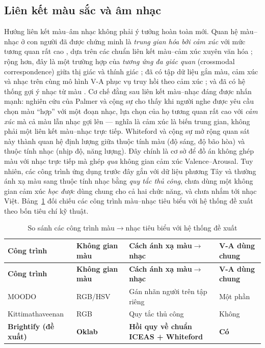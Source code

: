 \documentclass[../DoAn.tex]{subfiles}
\begin{document}
\subsection{Liên kết màu sắc và âm nhạc}
\label{subsection:2.1.3}
Hướng liên kết màu--âm nhạc không phải ý tưởng hoàn toàn mới. Quan hệ màu--nhạc ở con người đã được chứng minh là \textit{trung gian hóa bởi cảm xúc} với mức tương quan rất cao \cite{palmer2013music, whiteford2018color}, dựa trên các chuẩn liên kết màu--cảm xúc xuyên văn hóa \cite{jonauskaite2020universal}; rộng hơn, đây là một trường hợp của \textit{tương ứng đa giác quan} (crossmodal correspondence) giữa thị giác và thính giác \cite{spence2011crossmodal}; đã có tập dữ liệu gắn màu, cảm xúc và nhạc trên cùng mô hình V-A phục vụ truy hồi theo cảm xúc \cite{pesek2017moodo}; và đã có hệ thống gợi ý nhạc từ màu \cite{kittimathaveenan2020color}. Cơ chế đằng sau liên kết màu--nhạc đáng được nhấn mạnh: nghiên cứu của Palmer và cộng sự \cite{palmer2013music} cho thấy khi người nghe được yêu cầu chọn màu ``hợp'' với một đoạn nhạc, lựa chọn của họ tương quan rất cao với \textit{cảm xúc} mà cả màu lẫn nhạc gợi lên --- nghĩa là cảm xúc là biến trung gian, không phải một liên kết màu--nhạc trực tiếp. Whiteford và cộng sự \cite{whiteford2018color} mở rộng quan sát này thành quan hệ định lượng giữa thuộc tính màu (độ sáng, độ bão hòa) và thuộc tính nhạc (nhịp độ, năng lượng). Đây chính là cơ sở để đồ án không ghép màu với nhạc trực tiếp mà ghép \textit{qua} không gian cảm xúc Valence--Arousal. Tuy nhiên, các công trình ứng dụng trước đây gắn với dữ liệu phương Tây và thường ánh xạ màu sang thuộc tính nhạc bằng \textit{quy tắc thủ công}, chưa dùng một không gian cảm xúc \textit{học được} dùng chung cho cả hai chức năng, và chưa nhắm tới nhạc Việt. Bảng~\ref{table:colorprior} đối chiếu các công trình màu--nhạc tiêu biểu với hệ thống đề xuất theo bốn tiêu chí kỹ thuật.

\begin{longtable}{|p{3.0cm}|p{2.4cm}|p{3.0cm}|p{2.6cm}|}
\caption{So sánh các công trình màu$\rightarrow$nhạc tiêu biểu với hệ thống đề xuất}\label{table:colorprior}\\
\hline
\textbf{Công trình} & \textbf{Không gian màu} & \textbf{Cách ánh xạ màu$\rightarrow$nhạc} & \textbf{V-A dùng chung} \\
\hline
\endfirsthead
\hline
\textbf{Công trình} & \textbf{Không gian màu} & \textbf{Cách ánh xạ màu$\rightarrow$nhạc} & \textbf{V-A dùng chung} \\
\hline
\endhead
MOODO \cite{pesek2017moodo} & RGB/HSV & Gán nhãn người trên tập riêng & Một phần \\
\hline
Kittimathaveenan \cite{kittimathaveenan2020color} & RGB & Quy tắc thủ công & Không \\
\hline
\textbf{Brightify (đề xuất)} & \textbf{Oklab} & \textbf{Hồi quy về chuẩn ICEAS + Whiteford} & \textbf{Có} \\
\hline
\end{longtable}
\end{document}
